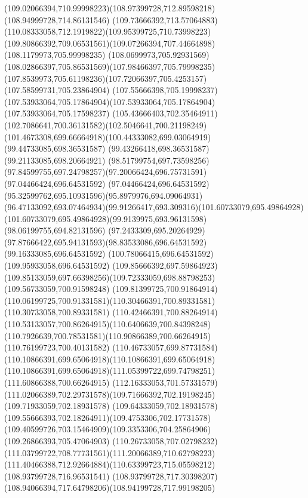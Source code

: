 {{	\curveto(109.02066394,710.99998223)(108.97399728,712.89598218)(108.94999728,714.86131546)
	\curveto(109.73666392,713.57064883)(110.08333058,712.1919822)(109.95399725,710.73998223)
	\curveto(109.80866392,709.06531561)(109.07266394,707.44664898)(108.1179973,705.99998235)
	\curveto(108.0699973,705.92931569)(108.02866397,705.86531569)(107.98466397,705.79998235)
	\curveto(107.8539973,705.61198236)(107.72066397,705.4253157)(107.58599731,705.23864904)
	\curveto(107.55666398,705.19998237)(107.53933064,705.17864904)(107.53933064,705.17864904)
	\lineto(107.53933064,705.17598237)
	\curveto(105.43666403,702.35464911)(102.7086641,700.36131582)(102.5046641,700.21198249)
	\curveto(101.4673308,699.66664918)(100.44333082,699.03064919)(99.44733085,698.36531587)
	\lineto(99.43266418,698.36531587)
	\lineto(99.21133085,698.20664921)
	\curveto(98.51799754,697.73598256)(97.84599755,697.24798257)(97.20066424,696.75731591)
	\lineto(97.04466424,696.64531592)
	\curveto(97.04466424,696.64531592)(95.32599762,695.10931596)(95.8979976,694.09064931)
	\curveto(96.47133092,693.07464934)(99.91266417,693.309316)(101.60733079,695.49864928)
	\curveto(101.60733079,695.49864928)(99.9139975,693.96131598)(98.06199755,694.82131596)
	\curveto(97.2433309,695.20264929)(97.87666422,695.94131593)(98.83533086,696.64531592)
	\lineto(99.16333085,696.64531592)
	\lineto(100.78066415,696.64531592)
	\lineto(109.95933058,696.64531592)
	\lineto(109.85666392,697.59864923)
	\curveto(109.85133059,697.66398256)(109.72333059,698.88798253)(109.56733059,700.91598248)
	\curveto(109.81399725,700.91864914)(110.06199725,700.91331581)(110.30466391,700.89331581)
	\lineto(110.30733058,700.89331581)
	\curveto(110.42466391,700.88264914)(110.53133057,700.86264915)(110.6406639,700.84398248)
	\curveto(110.7926639,700.78531581)(110.90866389,700.66264915)(110.76199723,700.40131582)
	\curveto(110.46733057,699.87731584)(110.10866391,699.65064918)(110.10866391,699.65064918)
	\curveto(110.10866391,699.65064918)(111.05399722,699.74798251)(111.60866388,700.66264915)
	\curveto(112.16333053,701.57331579)(111.02066389,702.29731578)(109.71666392,702.19198245)
	\lineto(109.71933059,702.18931578)
	\curveto(109.64333059,702.18931578)(109.55666393,702.18264911)(109.4753306,702.17731578)
	\curveto(109.40599726,703.15464909)(109.3353306,704.25864906)(109.26866393,705.47064903)
	\curveto(110.26733058,707.02798232)(111.03799722,708.77731561)(111.20066389,710.62798223)
	\curveto(111.40466388,712.92664884)(110.63399723,715.05598212)(108.93799728,716.96531541)
	\curveto(108.93799728,717.30398207)(108.94066394,717.64798206)(108.94199728,717.99198205)
}}
